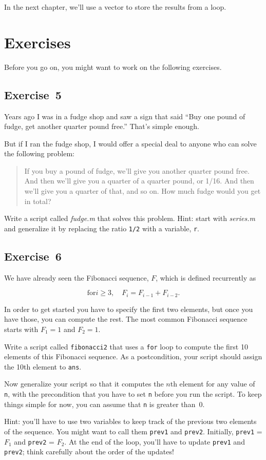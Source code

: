 In the next chapter, we'll use a vector to store the results from a loop.


\section{Exercises}

Before you go on, you might want to work on the following exercises.

\subsection{Exercise~5}
Years ago I was in a fudge shop and saw a sign that said ``Buy one pound of fudge, get another quarter pound free.''  That's simple enough.

But if I ran the fudge shop, I would offer a special deal to anyone who can solve the following problem:

\begin{quote}
If you buy a pound of fudge, we'll give you another quarter pound free.  And then we'll give you a quarter of a quarter pound, or 1/16.  And then we'll give you a quarter of that, and so on.  How much fudge would you get in total?
\end{quote}

Write a script called {\em fudge.m} that solves this problem.  Hint: start with {\em series.m} and generalize it by replacing the ratio \lstinline{1/2} with a variable, \lstinline{r}.





\subsection{Exercise~6}
\label{fib2}

We have already seen the Fibonacci sequence, $F$, which
is defined recurrently as

\[ \mathrm{for } i \ge 3, \quad  F_{i} = F_{i-1} + F_{i-2}. \]

In order to get started you have to specify the first two
elements, but once you have those, you can compute the rest.
The most common Fibonacci sequence starts with $F_1 = 1$ and $F_2 = 1$.

Write a script called \lstinline{fibonacci2} that uses a \lstinline{for} loop
to compute the first 10 elements of this Fibonacci sequence.
As a postcondition, your script should assign the 10th element to
\lstinline{ans}.

Now generalize your script so that it computes the $n$th element
for any value of \lstinline{n}, with the precondition that you have to
set \lstinline{n} before you run the script.  To keep things simple for
now, you can assume that \lstinline{n} is greater than~0.

Hint: you'll have to use two variables to keep track of the
previous two elements of the sequence.  You might want to call
them \lstinline{prev1} and \lstinline{prev2}.  Initially, \lstinline{prev1} = $F_1$
and \lstinline{prev2} = $F_2$.  At the end of the loop, you'll have
to update \lstinline{prev1} and \lstinline{prev2}; think carefully about the
order of the updates!


